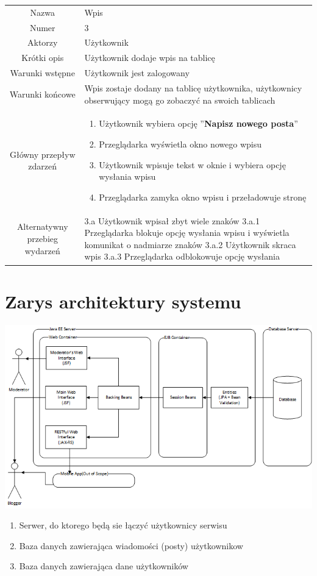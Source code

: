 \documentclass[a4paper]{article}
\begin{document}
\begin{tabular}{c p{10cm}}
Nazwa&	Wpis\\
Numer	& 3\\
Aktorzy &	Użytkownik\\
Krótki opis &  Użytkownik dodaje wpis na tablicę\\
Warunki wstępne& Użytkownik jest zalogowany\\
Warunki końcowe& Wpis zostaje dodany na tablicę użytkownika, użytkownicy obserwujący mogą go zobaczyć na swoich tablicach\\
Główny przepływ zdarzeń&
\begin{enumerate}
\item Użytkownik wybiera opcję ''\textbf{Napisz nowego posta}''
\item Przeglądarka wyświetla okno nowego wpisu
\item Użytkownik wpisuje tekst w oknie i wybiera opcję wysłania wpisu
\item Przeglądarka zamyka okno wpisu i przeładowuje stronę
\end{enumerate} \\

Alternatywny przebieg wydarzeń &
3.a Użytkownik wpisał zbyt wiele znaków \newline
3.a.1 Przeglądarka blokuje opcję wysłania wpisu i wyświetla komunikat o nadmiarze znaków \newline
3.a.2 Użytkownik skraca wpis \newline
3.a.3 Przeglądarka odblokowuje opcję wysłania \newline
\end{tabular}

\section{Zarys architektury systemu}
\includegraphics[width=\textwidth]{architecture}
\begin{enumerate}
\item Serwer, do ktorego będą sie łączyć użytkownicy serwisu
\item Baza danych zawierająca wiadomości (posty) użytkownikow
\item Baza danych zawierająca dane użytkowników
\end{enumerate}
\end{document}
